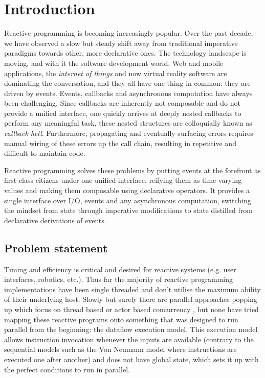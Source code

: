 \chapter{Introduction}

Reactive programming is becoming increasingly popular. Over the past decade, we have observed a slow but steady shift away from traditional imperative paradigms towards other, more declarative ones.
The technology landscape is moving, and with it the software development world. Web and mobile applications, the \textit{internet of things} and now virtual reality software are dominating the conversation, and they all have one thing in common: they are driven by events. Events, callbacks and asynchronous computation have always been challenging. Since callbacks are inherently not composable and do not provide a unified interface, one quickly arrives at deeply nested callbacks to perform any meaningful task, these nested structures are colloquially known as \textit{callback hell}. Furthermore, propagating and eventually surfacing errors requires manual wiring of these errors up the call chain, resulting in repetitive and difficult to maintain code. 

Reactive programming solves these problems by putting events at the forefront as first class citizens under one unified interface, reifying them as time varying values and making them composable using declarative operators. It provides a single interface over I/O, events and any asynchronous computation, switching the mindset from state through imperative modifications to state distilled from declarative derivations of events. 

\section{Problem statement}

Timing and efficiency is critical and desired for reactive systems (e.g. user interfaces, robotics, etc.).
Thus far the majority of reactive programming implementations have been single threaded and don't utilise the maximum ability of their underlying host. Slowly but surely there are parallel approaches popping up which focus on thread based or actor based concurrency \citep{peterson_parallel_2000}, but none have tried mapping these reactive programs onto something that was designed to run parallel from the beginning: the dataflow execution model. This execution model allows instruction invocation whenever the inputs are available (contrary to the sequential models such as the Von Neumann model where instructions are executed one after another) and does not have global state, which sets it up with the perfect conditions to run in parallel.

